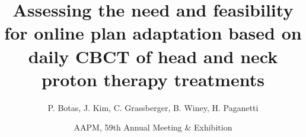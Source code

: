 \documentclass[pdf,dvipsnames,aspectratio=169]{beamer}
\begin{document}
\title[Assessing the need and feasibility for online plan adaptation based on daily CBCT of head and neck proton therapy treatments]{Assessing the need and feasibility for online plan adaptation based on daily CBCT of head and neck proton therapy treatments}
\author{\texorpdfstring{P. Botas, J. Kim, C. Grassberger, B. Winey, H. Paganetti }{Pablo Botas}}
\date{AAPM, 59th Annual Meeting \& Exhibition}

\begin{frame}
    \titlepage
\end{frame}

\end{document}
